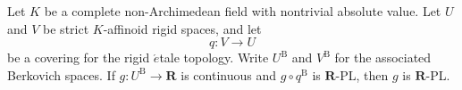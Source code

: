 \begin{lemma}
\label{lem:p061-rigid-etale-rpl-descent}
Let \(K\) be a complete non-Archimedean field with nontrivial absolute
value.  Let \(U\) and \(V\) be strict \(K\)-affinoid rigid spaces, and let
\[
                         q:V\longrightarrow U
\]
be a covering for the rigid \(\acute{e}\)tale topology.  Write
\(U^{\mathrm B}\) and \(V^{\mathrm B}\) for the associated Berkovich
spaces.  If \(g:U^{\mathrm B}\to\mathbf R\) is continuous and
\(g\circ q^{\mathrm B}\) is \(\mathbf R\)-PL, then \(g\) is
\(\mathbf R\)-PL.
\end{lemma}
